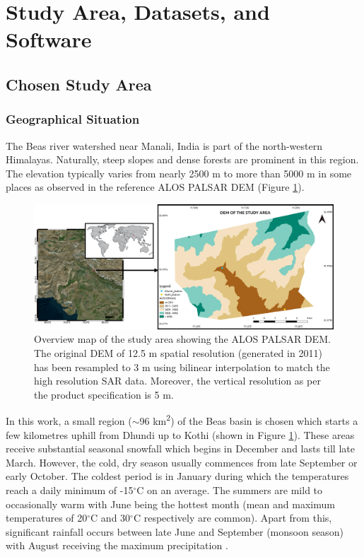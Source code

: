 \documentclass[12pt]{elsarticle}
\numberwithin{equation}{section}
\numberwithin{figure}{section}
\numberwithin{table}{section}
\begin{document}
\section{Study Area, Datasets, and Software}
\label{sec:study}

\subsection{Chosen Study Area}
\subsubsection{Geographical Situation}
\label{sssec:geo}
The Beas river watershed near Manali, India is part of the north-western Himalayas. Naturally, steep slopes and dense forests are prominent in this region. The elevation typically varies from nearly 2500 m to more than 5000 m in some places as observed in the reference ALOS PALSAR DEM (Figure \ref{fig:overview}). 

\begin{figure}[htb]
    \centering
    \includegraphics[width=\textwidth]{Figures/Overview.png}
    \caption{\doublespacing Overview map of the study area showing the ALOS PALSAR DEM. The original DEM of 12.5 m spatial resolution (generated in 2011) has been resampled to 3 m using bilinear interpolation \citep{Wu2008} to match the high resolution SAR data. Moreover, the vertical resolution as per the product specification is 5 m.}
    \label{fig:overview}
\end{figure}

In this work, a small region ($\sim$96 km\textsuperscript{2}) of the Beas basin is chosen which starts a few kilometres uphill from Dhundi up to Kothi (shown in Figure \ref{fig:overview}). These areas receive substantial seasonal snowfall which begins in December and lasts till late March. However, the cold, dry season usually commences from late September or early October. The coldest period is in January during which the temperatures reach a daily minimum of -15$^\circ$C on an average. The summers are mild to occasionally warm with June being the hottest month (mean and maximum temperatures of 20$^\circ$C and 30$^\circ$C respectively are common). Apart from this, significant rainfall occurs between late June and September (monsoon season) with August receiving the maximum precipitation \citep{Majumdar2019, Thakur2012}.
\end{document}
